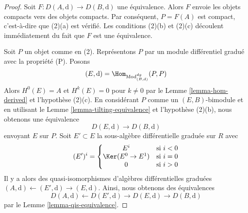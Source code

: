 \begin{proof}
Soit $F : D(A, \text{d}) \to D(B, \text{d})$ une équivalence. Alors $F$ envoie les
objets compacts vers des objets compacts. Par conséquent, $P = F(A)$ est compact,
c’est-à-dire que (2)(a) est vérifié. Les conditions (2)(b) et (2)(c) découlent
immédiatement du fait que $F$ est une équivalence.

\medskip\noindent
Soit $P$ un objet comme en (2). Représentons $P$ par un module différentiel gradué
avec la propriété (P). Posons
$$
(E, \text{d}) = \Hom_{\text{Mod}^{dg}_{(B, \text{d})}}(P, P)
$$
Alors $H^0(E) = A$ et $H^k(E) = 0$ pour $k \not = 0$ par le Lemme
\ref{lemma-hom-derived} et l'hypothèse (2)(c). En considérant $P$ comme un
$(E, B)$-bimodule et en utilisant le Lemme \ref{lemma-tilting-equivalence} et
l'hypothèse (2)(b), nous obtenons une équivalence
$$
D(E, \text{d}) \to D(B, \text{d})
$$
envoyant $E$ sur $P$. Soit $E' \subset E$ la sous-algèbre différentielle graduée sur $R$
avec
$$
(E')^i = \left\{
\begin{matrix}
E^i & \text{si }i < 0 \\
\Ker(E^0 \to E^1) & \text{si }i = 0 \\
0 & \text{si }i > 0
\end{matrix}
\right.
$$
Il y a alors des quasi-isomorphismes d’algèbres différentielles graduées $(A,
\text{d}) \leftarrow (E', \text{d}) \rightarrow (E, \text{d})$. Ainsi, nous
obtenons des équivalences
$$
D(A, \text{d}) \leftarrow D(E', \text{d}) \rightarrow D(E, \text{d})
\rightarrow D(B, \text{d})
$$
par le Lemme \ref{lemma-qis-equivalence}.
\end{proof}

